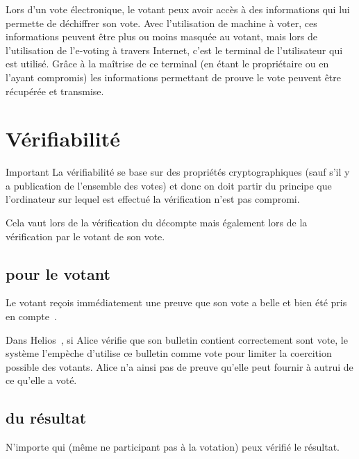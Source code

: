 \documentclass[../report]{subfiles}
\begin{document}
Lors d'un vote électronique, le votant peux avoir accès à des informations qui lui permette de déchiffrer son vote.
Avec l'utilisation de machine à voter, ces informations peuvent être plus ou moins masquée au votant, mais lors
de l'utilisation de l'e-voting à travers Internet, c'est le terminal de l'utilisateur qui est utilisé.
Grâce à la maîtrise de ce terminal (en étant le propriétaire ou en l'ayant compromis) les informations permettant
de prouve le vote peuvent être récupérée et transmise.

\section{Vérifiabilité}

\begin{important}{Important}
  La vérifiabilité se base sur des propriétés cryptographiques (sauf s'il y a publication 
  de l'ensemble des votes) et donc on doit partir du principe que l'ordinateur sur lequel 
  est effectué la vérification n'est pas compromi.

  Cela vaut lors de la vérification du décompte mais également 
  lors de la vérification par le votant de son vote.
\end{important}

\subsection{pour le votant}
Le votant reçois immédiatement une preuve que son vote a belle et bien été pris en 
compte~\cite{adida_ballot_2006}.

Dans Helios~\cite{noauthor_helios_nodate}, si Alice vérifie que son bulletin contient
correctement sont vote, le système l'empèche d'utilise ce bulletin comme vote pour limiter
la coercition possible des votants.
Alice n'a ainsi pas de preuve qu'elle peut fournir à autrui de ce qu'elle a voté.

\subsection{du résultat}
N'importe qui (même ne participant pas à la votation) peux vérifié le résultat.
\todo{}
\end{document}
